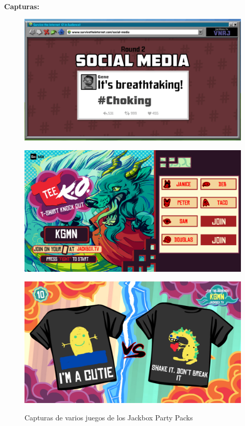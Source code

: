 \textbf{Capturas:}
\begin{figure}[H]
    \centering
    \begin{minipage}{0.40\textwidth}
        \centering
        \includegraphics[width=1.0\textwidth]{Cuerpo/4/JPP1.jpg} %
        \label{JPP-Internet}
    \end{minipage}\hfill
    \begin{minipage}{0.40\textwidth}
        \centering
        \includegraphics[width=1.0\textwidth]{Cuerpo/4/JPP2.jpg} %
        \label{JPP-Inicio}
    \end{minipage}
    \centering
    \begin{minipage}{0.40\textwidth}
        \centering
        \includegraphics[width=1.0\textwidth]{Cuerpo/4/JPP3.jpg} %
        \label{JPP-Tees}
    \end{minipage}
    \caption{Capturas de varios juegos de los Jackbox Party Packs}
\end{figure}

